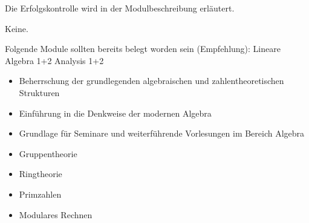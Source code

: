 \begin{course}

\setdoclanguagegerman
{}


\courselevel{}
\courseinstructionlanguage{}

\coursehead


\label{cour_7865.dp_997}


\begin{styleenv}
\begin{assessment}
Die Erfolgskontrolle wird in der Modulbeschreibung erläutert.


\end{assessment}

\begin{conditions}Keine.\end{conditions}

\begin{recommendations}Folgende Module sollten bereits belegt worden sein (Empfehlung):\newline
Lineare Algebra 1+2\newline
Analysis 1+2

\end{recommendations}
\end{styleenv}

\begin{learningoutcomes}
\begin{itemize}\item Beherrschung der grundlegenden algebraischen und zahlentheoretischen Strukturen  \item Einführung in die Denkweise der modernen Algebra  \item Grundlage für Seminare und weiterführende Vorlesungen im Bereich Algebra  \end{itemize}
\end{learningoutcomes}

\begin{content}
\begin{itemize}\item Gruppentheorie  \item Ringtheorie  \item Primzahlen  \item Modulares Rechnen  \end{itemize}
\end{content}







\end{course}
